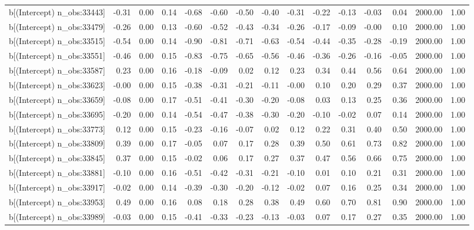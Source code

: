 \begin{table}[ht]
\begin{tabular}{rrrrrrrrrrrrrrr}
  b[(Intercept) n\_obs:33443] & -0.31 & 0.00 & 0.14 & -0.68 & -0.60 & -0.50 & -0.40 & -0.31 & -0.22 & -0.13 & -0.03 & 0.04 & 2000.00 & 1.00 \\ 
  b[(Intercept) n\_obs:33479] & -0.26 & 0.00 & 0.13 & -0.60 & -0.52 & -0.43 & -0.34 & -0.26 & -0.17 & -0.09 & -0.00 & 0.10 & 2000.00 & 1.00 \\ 
  b[(Intercept) n\_obs:33515] & -0.54 & 0.00 & 0.14 & -0.90 & -0.81 & -0.71 & -0.63 & -0.54 & -0.44 & -0.35 & -0.28 & -0.19 & 2000.00 & 1.00 \\ 
  b[(Intercept) n\_obs:33551] & -0.46 & 0.00 & 0.15 & -0.83 & -0.75 & -0.65 & -0.56 & -0.46 & -0.36 & -0.26 & -0.16 & -0.05 & 2000.00 & 1.00 \\ 
  b[(Intercept) n\_obs:33587] & 0.23 & 0.00 & 0.16 & -0.18 & -0.09 & 0.02 & 0.12 & 0.23 & 0.34 & 0.44 & 0.56 & 0.64 & 2000.00 & 1.00 \\ 
  b[(Intercept) n\_obs:33623] & -0.00 & 0.00 & 0.15 & -0.38 & -0.31 & -0.21 & -0.11 & -0.00 & 0.10 & 0.20 & 0.29 & 0.37 & 2000.00 & 1.00 \\ 
  b[(Intercept) n\_obs:33659] & -0.08 & 0.00 & 0.17 & -0.51 & -0.41 & -0.30 & -0.20 & -0.08 & 0.03 & 0.13 & 0.25 & 0.36 & 2000.00 & 1.00 \\ 
  b[(Intercept) n\_obs:33695] & -0.20 & 0.00 & 0.14 & -0.54 & -0.47 & -0.38 & -0.30 & -0.20 & -0.10 & -0.02 & 0.07 & 0.14 & 2000.00 & 1.00 \\ 
  b[(Intercept) n\_obs:33773] & 0.12 & 0.00 & 0.15 & -0.23 & -0.16 & -0.07 & 0.02 & 0.12 & 0.22 & 0.31 & 0.40 & 0.50 & 2000.00 & 1.00 \\ 
  b[(Intercept) n\_obs:33809] & 0.39 & 0.00 & 0.17 & -0.05 & 0.07 & 0.17 & 0.28 & 0.39 & 0.50 & 0.61 & 0.73 & 0.82 & 2000.00 & 1.00 \\ 
  b[(Intercept) n\_obs:33845] & 0.37 & 0.00 & 0.15 & -0.02 & 0.06 & 0.17 & 0.27 & 0.37 & 0.47 & 0.56 & 0.66 & 0.75 & 2000.00 & 1.00 \\ 
  b[(Intercept) n\_obs:33881] & -0.10 & 0.00 & 0.16 & -0.51 & -0.42 & -0.31 & -0.21 & -0.10 & 0.01 & 0.10 & 0.21 & 0.31 & 2000.00 & 1.00 \\ 
  b[(Intercept) n\_obs:33917] & -0.02 & 0.00 & 0.14 & -0.39 & -0.30 & -0.20 & -0.12 & -0.02 & 0.07 & 0.16 & 0.25 & 0.34 & 2000.00 & 1.00 \\ 
  b[(Intercept) n\_obs:33953] & 0.49 & 0.00 & 0.16 & 0.08 & 0.18 & 0.28 & 0.38 & 0.49 & 0.60 & 0.70 & 0.81 & 0.90 & 2000.00 & 1.00 \\ 
  b[(Intercept) n\_obs:33989] & -0.03 & 0.00 & 0.15 & -0.41 & -0.33 & -0.23 & -0.13 & -0.03 & 0.07 & 0.17 & 0.27 & 0.35 & 2000.00 & 1.00 \\ 

\end{tabular}
\end{table}
